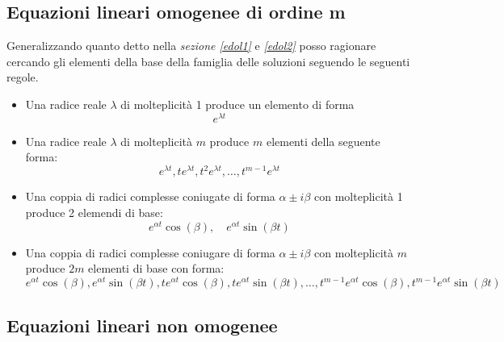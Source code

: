 \subsection{Equazioni lineari omogenee di ordine m}
Generalizzando quanto detto nella \textit{sezione \ref{edol1}} e \textit{\ref{edol2}} posso ragionare cercando gli elementi della base della famiglia delle soluzioni seguendo le seguenti regole.
\begin{itemize}
	\item Una radice reale $ \lambda  $ di molteplicità 1 produce un elemento di forma
	      \[
		      e^{\lambda t}
	      \]
	\item Una radice reale $ \lambda  $ di molteplicità $ m $ produce $ m $ elementi della seguente forma:
	      \[
		      e^{\lambda t}, te^{\lambda t}, t^2 e ^{\lambda t},\ldots, t ^{m-1}e^{\lambda t}
	      \]
	\item Una coppia di radici complesse coniugate di forma $  \alpha  \pm i \beta  $ con molteplicità 1 produce 2 elemendi di base:
	      \[
		      e^{\alpha t} \cos \left( \beta  \right) , \quad  e ^{\alpha t}\sin \left( \beta t \right)
	      \]
	\item Una coppia di radici complesse coniugare di forma $ \alpha  \pm i \beta  $ con molteplicità $ m $ produce $ 2m $ elementi di base con forma:
	      \[
		      e^{\alpha t} \cos \left( \beta  \right) ,  e ^{\alpha t}\sin \left( \beta t \right), te^{\alpha t} \cos \left( \beta  \right) ,  te ^{\alpha t}\sin \left( \beta t \right),\ldots,  t ^{m-1}e^{\alpha t} \cos \left( \beta  \right) ,  t^{m-1}e ^{\alpha t}\sin \left( \beta t \right)
	      \]
\end{itemize}
\subsection{Equazioni lineari non omogenee} \label{edononomogenee}
